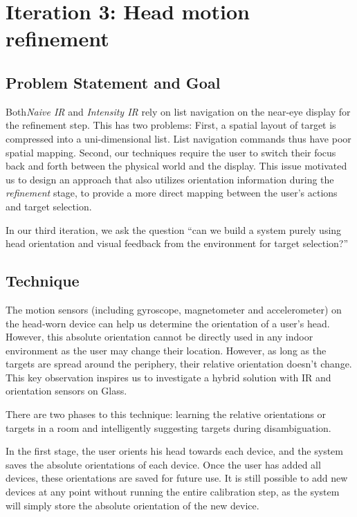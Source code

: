 \section{Iteration 3: Head motion refinement}
\label{sec:iteration-3:-head}
\subsection{Problem Statement and Goal}
Both{\em Naive IR} and {\em Intensity IR} rely on list navigation on the near-eye display for the refinement step. This has two problems: First, a spatial layout of target is compressed into a uni-dimensional list. List navigation commands thus have poor spatial mapping. Second, our techniques require the user to switch their focus back and forth between the physical world and the display. This issue motivated us to design an approach that also utilizes orientation information during the {\em refinement} stage, to provide a more direct mapping between the user's actions and target selection.

In our third iteration, we ask the question ``can we build a system purely using head orientation and visual feedback from the environment for target selection?''

\subsection{Technique}
The motion sensors (including gyroscope, magnetometer and accelerometer) on the head-worn device can help us determine the orientation of a user's head. However, this absolute orientation cannot be directly used in any indoor environment as the user may change their location. However, as long as the targets are spread around the periphery, their relative orientation doesn't change. This key observation inspires us to investigate a hybrid solution with IR and orientation sensors on Glass.

There are two phases to this technique: learning the relative orientations or targets in a room and intelligently suggesting targets during disambiguation.

In the first stage, the user orients his head towards each device, and the system saves the absolute orientations of each device. Once the user has added all devices, these orientations are saved for future use. It is still possible to add new devices at any point without running the entire calibration step, as the system will simply store the absolute orientation of the new device.

